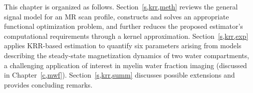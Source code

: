 This chapter is organized as follows.
Section~\ref{s,krr,meth}
reviews the general signal model
for an MR scan profile,
constructs and solves 
an appropriate functional optimization problem,
and further reduces the proposed estimator's
computational requirements
through a kernel approximation.
Section~\ref{s,krr,exp}
applies KRR-based estimation
to quantify six parameters arising 
from models describing the steady-state 
magnetization dynamics
of two water compartments,
a challenging application
of interest in myelin water fraction imaging 
(discussed in Chapter~\ref{c,mwf}).
Section~\ref{s,krr,summ}
discusses possible extensions 
and provides concluding remarks.
